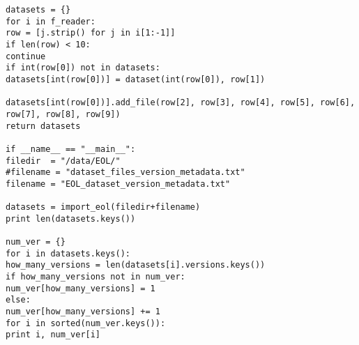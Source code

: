 \begin{verbatim}
datasets = {}
for i in f_reader:
row = [j.strip() for j in i[1:-1]]
if len(row) < 10:
continue
if int(row[0]) not in datasets:
datasets[int(row[0])] = dataset(int(row[0]), row[1])

datasets[int(row[0])].add_file(row[2], row[3], row[4], row[5], row[6], row[7], row[8], row[9])
return datasets

if __name__ == "__main__":
filedir  = "/data/EOL/"
#filename = "dataset_files_version_metadata.txt"
filename = "EOL_dataset_version_metadata.txt"

datasets = import_eol(filedir+filename)
print len(datasets.keys())

num_ver = {}
for i in datasets.keys():
how_many_versions = len(datasets[i].versions.keys())
if how_many_versions not in num_ver:
num_ver[how_many_versions] = 1
else:
num_ver[how_many_versions] += 1
for i in sorted(num_ver.keys()):
print i, num_ver[i]
\end{verbatim}